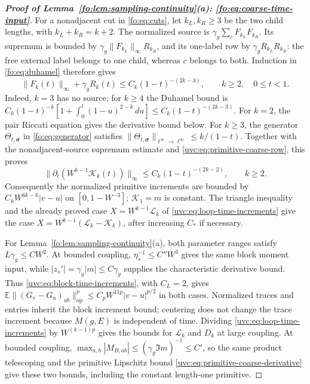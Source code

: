 \documentclass[11pt]{article}
\numberwithin{equation}{section}
\theoremstyle{remark}
\newcommand{\E}{\mathbb E}
\newcommand{\cL}{\mathcal L}
\newcommand{\cK}{\mathcal K}
\newcommand{\op}{\mathrm{op}}
\begin{document}
\begin{proof}[\textbf{Proof of Lemma~\ref{fo:lem:sampling-continuity}(a): \eqref{fo:eq:coarse-time-input}}]
For a nonadjacent cut in \eqref{fo:eq:cuts}, let $k_L,k_R\ge3$ be the
two child lengths, with $k_L+k_R=k+2$. The normalized source is
$\gamma_g\sum_cF_{k_L}F_{k_R}$. Its supremum is bounded by
$\gamma_g\|F_{k_L}\|_\infty R_{k_R}$, and its one-label row by
$\gamma_gR_{k_L}R_{k_R}$: the free external label belongs to one child,
whereas $c$ belongs to both. Induction in \eqref{fo:eq:duhamel} therefore gives
\begin{equation}\label{uvc:eq:primitive-coarse-row}
 \|F_k(t)\|_\infty+\gamma_gR_k(t)
 \le C_k(1-t)^{-(2k-3)},\qquad k\ge2,\quad 0\le t<1.
\end{equation}
Indeed, $k=3$ has no source; for $k\ge4$ the Duhamel bound is
$C_k(1-t)^{-k}[1+\int_0^t(1-u)^{2-k}\,du]
\le C_k(1-t)^{-(2k-3)}$.
For $k=2$, the pair Riccati equation gives the derivative bound below.
For $k\ge3$, the generator $\Theta_{t,\boldsymbol\sigma}$ in
\eqref{fo:eq:generator} satisfies
$\|\Theta_{t,\boldsymbol\sigma}\|_{\ell^\infty\to\ell^\infty}\le k/(1-t)$.
Together with the nonadjacent-source supremum estimate and
\eqref{uvc:eq:primitive-coarse-row}, this proves
\begin{equation}\label{uvc:eq:primitive-coarse-derivative}
 \|\partial_t(W^{k-1}\cK_k(t))\|_\infty
 \le C_k(1-t)^{-(2k-2)},\qquad k\ge2.
\end{equation}
Consequently the normalized primitive increments are bounded by
$C_kW^{6k-6}|v-u|$ on $[0,1-W^{-3}]$; $\cK_1=m$ is constant.
The triangle inequality and the already proved case $X=W^{k-1}\cL_k$
of \eqref{uvc:eq:loop-time-increments} give the case
$X=W^{k-1}(\cL_k-\cK_k)$, after increasing $C_*$ if necessary.

For Lemma~\ref{fo:lem:sampling-continuity}(a), both parameter ranges
satisfy $L\gamma_g\le CW^2$. At bounded coupling,
$\eta_s^{-1}\le C''W^3$ gives the same block moment input, while
$|z_s'|=\gamma_g|m|\le C\gamma_g$ supplies the characteristic derivative bound.
Thus \eqref{uvc:eq:block-time-increments}, with $C_L=2$, gives
$\E\|(G_v-G_u)_{ab}\|_{\op}^p\le C_pW^{11p}|v-u|^{p/2}$
in both cases.
Normalized traces and entries inherit the block increment bound;
centering does not change the trace increment because $M(g,E)$ is
independent of time. Dividing \eqref{uvc:eq:loop-time-increments} by
$W^{(k-1)p}$ gives the bounds for $\cL_k$ and $D_k$ at large coupling. At bounded
coupling, $\max_{a,b}|M_{B,ab}|\le(\gamma_g\Im m)^{-1}\le C'$,
so the same product telescoping and the primitive Lipschitz
bound \eqref{uvc:eq:primitive-coarse-derivative} give these two bounds, including
the constant length-one primitive.


\end{proof}
\end{document}
